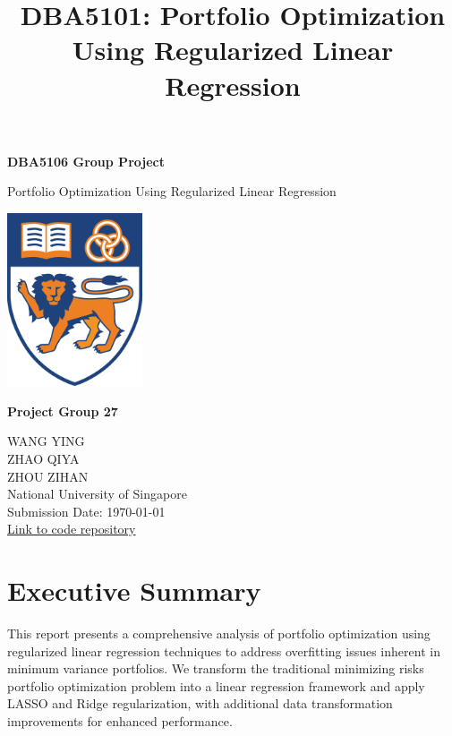 \documentclass[12pt]{article}
\title{DBA5101: Portfolio Optimization Using Regularized Linear Regression}
\author{}
\date{}
\begin{document}
\begin{titlepage}
    \centering
    \vspace*{1cm}
    {\Huge\bfseries DBA5106 Group Project\\[0.5em]}
    {\Huge Portfolio Optimization Using Regularized Linear Regression \par}
    \vspace{1cm}
    \includegraphics[width=0.30\textwidth]{nus_logo.png} \\[2em]
    {\large \textbf{Project Group 27}\par}
    \vspace{0.5cm}
    {\small
    WANG YING \\[0.2em]
    ZHAO QIYA \\[0.2em]
    ZHOU ZIHAN \\[0.2em]
    }
    \vspace{1cm}
    {\large
    National University of Singapore \\
    \vspace{0.5cm}
    Submission Date: \today \\
    \vspace{0.3cm}
    \href{https://github.com/ying-jeanne/Business_Analytics/tree/main/I}{Link to code repository}
    }
    \vfill
\end{titlepage}

\newpage

\section{Executive Summary}

This report presents a comprehensive analysis of portfolio optimization using regularized linear regression techniques to address overfitting issues inherent in minimum variance portfolios. We transform the traditional minimizing risks portfolio optimization problem into a linear regression framework and apply LASSO and Ridge regularization, with additional data transformation improvements for enhanced performance.
\end{document}
